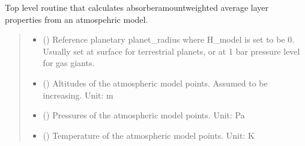 \documentclass[letterpaper,10pt,english]{sphinxmanual}
\begin{document}
\begin{fulllineitems}
\label{\detokenize{api:nemesispy.calc_layer}}
\pysigstartsignatures
{}
\pysigstopsignatures
\sphinxAtStartPar
Top level routine that calculates absorber\sphinxhyphen{}amount\sphinxhyphen{}weighted average
layer properties from an atmospehric model.
\begin{quote}\begin{description}
\begin{itemize}
\item {} 
\sphinxAtStartPar
{} () \textendash{} Reference planetary planet\_radius where H\_model is set to be 0.  Usually
set at surface for terrestrial planets, or at 1 bar pressure level for
gas giants.

\item {} 
\sphinxAtStartPar
{}\sphinxstyleliteralstrong{\sphinxupquote{(}}\sphinxstyleliteralstrong{\sphinxupquote{)}} () \textendash{} Altitudes of the atmospheric model points.
Assumed to be increasing.
Unit: m

\item {} 
\sphinxAtStartPar
{}\sphinxstyleliteralstrong{\sphinxupquote{(}}\sphinxstyleliteralstrong{\sphinxupquote{)}} () \textendash{} Pressures of the atmospheric model points.
Unit: Pa

\item {} 
\sphinxAtStartPar
{}\sphinxstyleliteralstrong{\sphinxupquote{(}}\sphinxstyleliteralstrong{\sphinxupquote{)}} () \textendash{} Temperature of the atmospheric model points.
Unit: K


\end{itemize}
\end{description}
\end{quote}
\end{fulllineitems}
\end{document}
